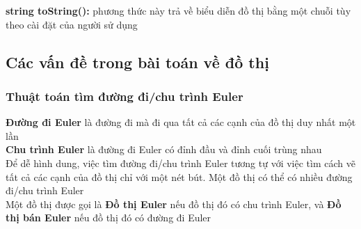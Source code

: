 \documentclass[a4paper]{article}
\begin{document}
\textbf{string toString():} phương thức này trả về biểu diễn đồ thị bằng một chuỗi tùy theo cài đặt của người sử dụng


    \subsection{Các vấn đề trong bài toán về đồ thị}
        \subsubsection{Thuật toán tìm đường đi/chu trình Euler}
\textbf{Đường đi Euler} là đường đi mà đi qua tất cả các cạnh của đồ thị duy nhất một lần \\

\textbf{Chu trình Euler} là đường đi Euler có đỉnh đầu và đỉnh cuối trùng nhau \\

Để dễ hình dung, việc tìm đường đi/chu trình Euler tương tự với việc tìm cách vẽ tất cả các cạnh của đồ thị chỉ với một nét bút. Một đồ thị có thể có nhiều đường đi/chu trình Euler \\

Một đồ thị được gọi là \textbf{Đồ thị Euler} nếu đồ thị đó có chu trình Euler, và \textbf{Đồ thị bán Euler} nếu đồ thị đó có đường đi Euler \\
\end{document}
